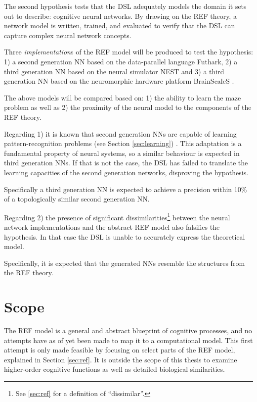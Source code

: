\documentclass[report.tex]{subfiles}
\begin{document}
The second hypothesis tests that the DSL adequately models the domain it sets
out to describe: cognitive neural networks.
By drawing on the REF theory, a network model is written, trained, and evaluated to verify
that the DSL can capture complex neural network concepts.

Three \textit{implementation}s of the \gls{REF} model will be
produced to test the hypothesis: 
  1) a second generation \gls{NN} based on the data-parallel language Futhark, 
  2) a third generation \gls{NN} based on the neural simulator NEST and
  3) a third generation \gls{NN} based on the neuromorphic 
     hardware platform BrainScaleS .

The above models will be compared based on:
1) the ability to learn the maze problem as well as 
2) the proximity of the neural model to the components of the
   \gls{REF} theory.

Regarding 1) it is known that second generation \gls{NN}s are
capable of learning pattern-recognition problems (see Section \ref{sec:learning})
\cite{Russel2007}.
This adaptation is a fundamental property of neural systems, so a
similar behaviour is expected in third generation \gls{NN}s.
If that is not the case, the \gls{DSL} has failed to translate
the learning capacities of the second generation networks,
disproving the hypothesis.

Specifically a third generation \gls{NN} is expected to
achieve a precision within 10\% of a topologically similar
second generation \gls{NN}.

Regarding 2) the presence of significant
dissimilarities\footnote{See \ref{sec:ref} for a definition of
\enquote{dissimilar}.} between the neural network implementations 
and the abstract \gls{REF} model also falsifies the hypothesis. 
In that case the \gls{DSL} is unable to accurately express the
theoretical model.

Specifically, it is expected that the generated \gls{NN}s resemble
the structures from the \gls{REF} theory.

\section{Scope} \label{sec:scope}
The \gls{REF} model is a general and abstract blueprint of cognitive
processes, and no attempts have as of yet been made to map it to
a computational model.
This first attempt is only made feasible by focusing on select parts
of the \gls{REF} model, explained in Section \ref{sec:ref}.
It is outside the scope of this thesis to examine
higher-order cognitive functions as well as detailed biological
similarities.
\end{document}
